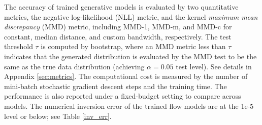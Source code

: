 \documentclass{article}
\theoremstyle{remark}
\theoremstyle{plain}
\newcommand{\revold}[1]{{\color{black}#1}}
\begin{document}
{The accuracy of trained generative models is evaluated by two quantitative metrics,
the negative log-likelihood (NLL) metric,
 and the kernel \textit{maximum mean discrepancy} (MMD)  \citep{Gretton2012AKT} metric, 
 including MMD-1, MMD-m, and MMD-c
 for constant, median distance, and custom bandwidth, respectively.
The test threshold $\tau$ is computed by bootstrap, where an MMD metric less than $\tau$ indicates that the generated distribution is evaluated by the MMD test to be the same as  the true data distribution (achieving $\alpha = 0.05$ test level).
 See details in Appendix \ref{sec:metrics}.
The computational cost is measured by the number of mini-batch stochastic gradient descent steps %
and the training time. The performance is also reported under a fixed-budget setting to compare across models.
\revold{The numerical inversion error of the trained flow models are at the 1e-5 level or below; see Table \ref{inv_err}.}

}
\end{document}
